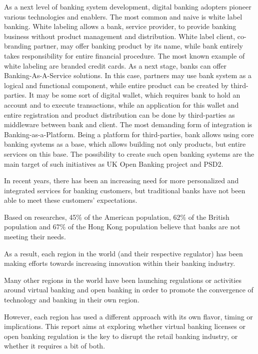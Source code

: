 As a next level of banking system development, digital banking adopters pioneer various technologies and enablers. 
The most common and naive is white label banking. 
White labeling allows a bank, service provider, to provide banking business without product management and distribution. White label client, co-branding partner, may offer banking product by its name, while bank entirely takes responsibility for entire financial procedure.
The most known example of white labeling are branded credit cards.
As a next stage, banks can offer Banking-As-A-Service solutions. 
In this case, partners may use bank system as a logical and functional component, while entire product can be created by third-parties. It may be some sort of digital wallet, which requires bank to hold an account and to execute transactions, while an application for this wallet and entire registration and product distribution can be done by third-parties as middleware between bank and client.
The most demanding form of integration is Banking-as-a-Platform. Being a platform for third-parties, bank allows using core banking systems as a base, which allows building not only products, but entire services on this base. 
The possibility to create such open banking systems are the main target of such initiatives as UK Open Banking project and PSD2.
\cite{what_is_digital_banking}

In recent years, there has been an increasing need for more personalized and integrated services for banking customers, but traditional banks have not been able to meet these customers’ expectations.

Based on researches, 45\% of the American population, 62\% of the British population and 67\% of the Hong Kong population believe that banks are not meeting their needs.
\cite{wavestone_virtual_banking}

As a result, each region in the world (and their respective regulator) has been making efforts towards increasing innovation within their banking industry.

Many other regions in the world have been launching regulations or activities around virtual banking and open banking in order to promote the convergence of technology and banking in their own region.

However, each region has used a different approach with its own flavor, timing or implications.
This report aims at exploring whether virtual banking licenses 
or open banking regulation is the key to disrupt the retail banking industry, 
or whether it requires a bit of both. 

